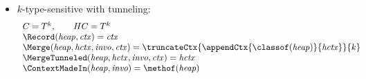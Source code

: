 {\begin{itemize}
\item $k$-type-sensitive with tunneling:
\[
\begin{array}{l}
C = T^k, \qquad HC = T^k \\
\Record ({\it heap}, {\it ctx}) = {\it ctx}\\
\Merge ({\it heap, hctx, invo, ctx}) =
  \truncateCtx{\appendCtx{\classof({\it heap})}{{\it hctx}}}{k} \\
\MergeTunneled ({\it heap, hctx, invo, ctx}) = {\it hctx} \\
\ContextMadeIn ({\it heap}, {\it invo}) = \methof({\it heap})
\end{array}
\]


\end{itemize}
}


